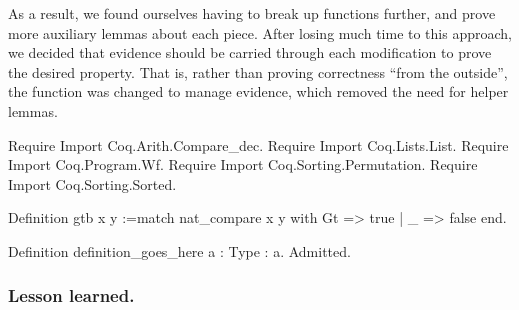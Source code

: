 \documentclass{llncs}
\newenvironment{MyCoqExampleStar}{\small \verbatim}{\endverbatim \normalsize}
\begin{document}
As a result, we found ourselves having to break up functions further, and
prove more auxiliary lemmas about each piece.  After losing much time to this
approach, we decided that evidence should be carried through each modification
to prove the desired property.  That is, rather than proving correctness
``from the outside'', the function was changed to manage evidence, which
removed the need for helper lemmas.

% 


\begin{MyCoqEval}
Require Import Coq.Arith.Compare_dec.
Require Import Coq.Lists.List.
Require Import Coq.Program.Wf.
Require Import Coq.Sorting.Permutation.
Require Import Coq.Sorting.Sorted.

Definition gtb x y :=match nat_compare x y with Gt => true | _ => false end.

Definition definition_goes_here {a : Type} : a. Admitted.
\end{MyCoqEval}

\subsubsection*{Lesson learned.}
\end{document}

